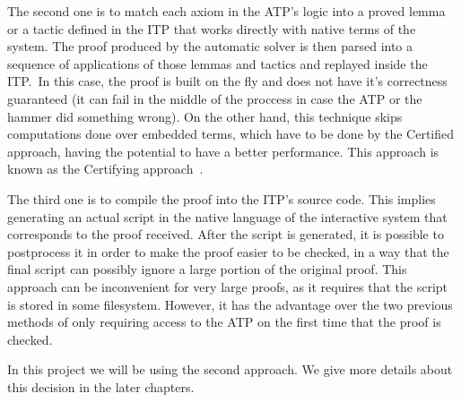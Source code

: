 The second one is to match each axiom in the ATP's logic into a proved lemma or a tactic
defined in the ITP that works directly with native terms of the system.
The proof produced by the automatic solver is then parsed into a sequence of applications
of those lemmas and tactics and replayed inside the ITP.\ In this case, the proof is built
on the fly and does not have it's correctness guaranteed (it can fail in the middle of the
proccess in case the ATP or the hammer did something wrong). On the other hand,
this technique skips computations done over embedded terms, which have to be done by the
Certified approach, having the potential to have a better
performance. This approach is known as the Certifying approach\ \cite{snipe}.

The third one is to compile the proof into the ITP's source code. This implies generating
an actual script in the native language of the interactive system
that corresponds to the proof received. After the script is generated, it is
possible to postprocess
it in order to make the proof easier to be checked,
in a way that the final script can possibly ignore a large portion of the
original proof. This approach can be inconvenient for very large proofs,
as it requires that the script is stored in some filesystem. However,
it has the advantage over the two previous methods of only requiring access to the ATP
on the first time that the proof is checked.

In this project we will be using the second approach. We give more details about this
decision in the later chapters.

